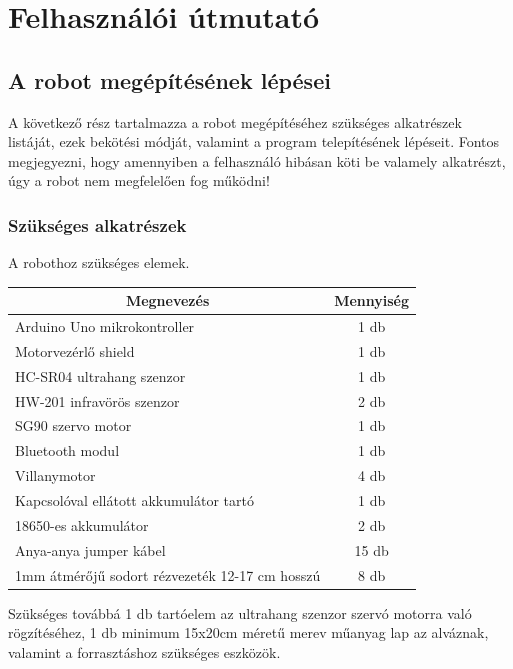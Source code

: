 \documentclass[]{thesis-ekf}
\theoremstyle{definition}
\begin{document}
\chapter{Felhasználói útmutató}\label{fejezet_7}
\section{A robot megépítésének lépései}
A következő rész tartalmazza a robot megépítéséhez szükséges alkatrészek listáját, ezek bekötési módját, valamint a program telepítésének lépéseit. Fontos megjegyezni, hogy amennyiben a felhasználó hibásan köti be valamely alkatrészt, úgy a robot nem megfelelően fog működni!

\subsection{Szükséges alkatrészek}
A robothoz szükséges elemek.

\begin{center}
	\begin{tabular}{|l|c|}
	\hline
	\multicolumn{1}{|c|}{\textbf{Megnevezés}}&\textbf{Mennyiség}\\
	\hline
	Arduino Uno mikrokontroller&1 db\\
	\hline
	Motorvezérlő shield&1 db\\
	\hline
	HC-SR04 ultrahang szenzor&1 db\\
	\hline
	HW-201 infravörös szenzor&2 db\\
	\hline
	SG90 szervo motor&1 db\\
	\hline
	Bluetooth modul&1 db\\
	\hline
	Villanymotor&4 db\\
	\hline
	Kapcsolóval ellátott akkumulátor tartó&1 db\\
	\hline
	18650-es akkumulátor&2 db\\
	\hline
	Anya-anya jumper kábel&15 db\\
	\hline
	1mm átmérőjű sodort rézvezeték 12-17 cm hosszú&8 db\\
	\hline
\end{tabular}
\end{center}
Szükséges továbbá 1 db tartóelem az ultrahang szenzor szervó motorra való rögzítéséhez, 1 db minimum 15x20cm méretű merev műanyag lap az alváznak, valamint a forrasztáshoz szükséges eszközök.
\end{document}
